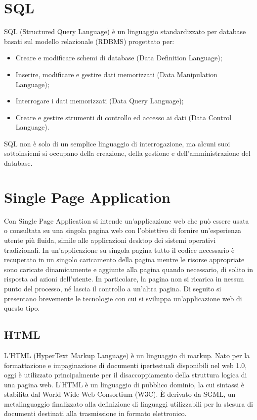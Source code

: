 \section{SQL}
SQL (Structured Query Language) \cite{wiki:sql} è un linguaggio standardizzato per database basati sul modello relazionale (RDBMS) progettato per:
\begin{itemize}
	
	\item Creare e modificare schemi di database (Data Definition Language);
	
	\item Inserire, modificare e gestire dati memorizzati (Data Manipulation Language);
	
	\item Interrogare i dati memorizzati (Data Query Language);
	
	\item Creare e gestire strumenti di controllo ed accesso ai dati (Data Control Language).
	
\end{itemize}
SQL non è solo di un semplice linguaggio di interrogazione, ma alcuni suoi sottoinsiemi si occupano della creazione, della gestione e dell'amministrazione del database.

\section{Single Page Application}
Con Single Page Application \cite{wiki:single-page-application} si intende un'applicazione web che può essere usata o consultata su una singola pagina web con l'obiettivo di fornire un'esperienza utente più fluida, simile alle applicazioni desktop dei sistemi operativi tradizionali. In un'applicazione su singola pagina tutto il codice necessario è recuperato in un singolo caricamento della pagina mentre le risorse appropriate sono caricate dinamicamente e aggiunte alla pagina quando necessario, di solito in risposta ad azioni dell'utente. In particolare, la pagina non si ricarica in nessun punto del processo, né lascia il controllo a un'altra pagina. Di seguito si presentano brevemente le tecnologie con cui si sviluppa un'applicazione web di questo tipo.

\subsection{HTML}
L'HTML (HyperText Markup Language) \cite{HTML:site} è un linguaggio di markup. Nato per la formattazione e impaginazione di documenti ipertestuali disponibili nel web 1.0, oggi è utilizzato principalmente per il disaccoppiamento della struttura logica di una pagina web. L'HTML è un linguaggio di pubblico dominio, la cui sintassi è stabilita dal World Wide Web Consortium (W3C). È derivato da SGML, un metalinguaggio finalizzato alla definizione di linguaggi utilizzabili per la stesura di documenti destinati alla trasmissione in formato elettronico.

